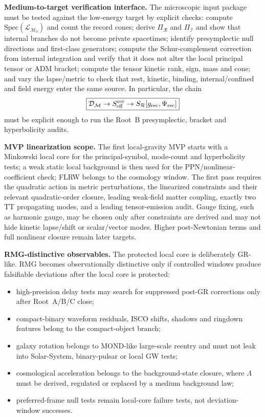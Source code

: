 \documentclass[11pt]{article}
\begin{document}
\medskip\noindent\textbf{Medium-to-target verification interface.}
The microscopic input package must be tested against the low-energy target by
explicit checks: compute \(\mathrm{Spec}(\mathcal L_{\mathcal M_0})\) and count
the record cones; derive \(\Pi_{\mathcal R}\) and \(\Pi_{\mathcal I}\) and
show that internal branches do not become private spacetimes; identify
presymplectic null directions and first-class generators; compute the
Schur-complement correction from internal integration and verify that it does
not alter the local principal tensor or ADM bracket; compute the tensor
kinetic rank, sign, mass and cone; and vary the lapse/metric to check that
rest, kinetic, binding, internal/confined and field energy enter the same
source.  In particular, the chain
\[
\boxed{
\mathcal D_{\mathcal M}\to S_{\rm eff}^{\rm rec}\to
S_{\mathcal R}[g_{\rm rec},\Psi_{\rm rec}]
}
\]
must be explicit enough to run the Root~B presymplectic, bracket and
hyperbolicity audits.

\medskip\noindent\textbf{MVP linearization scope.}
The first local-gravity MVP starts with a Minkowski local core for the
principal-symbol, mode-count and hyperbolicity tests; a weak static local
background is then used for the PPN/nonlinear-coefficient check; FLRW belongs
to the cosmology window.  The first pass requires the quadratic action in
metric perturbations, the linearized constraints and their relevant
quadratic-order closure, leading weak-field matter coupling, exactly two TT
propagating modes, and a leading tensor-emission audit.  Gauge fixing, such as
harmonic gauge, may be chosen only after constraints are derived and may not
hide kinetic lapse/shift or scalar/vector modes.  Higher post-Newtonian terms
and full nonlinear closure remain later targets.

\medskip\noindent\textbf{RMG-distinctive observables.}
The protected local core is deliberately GR-like.  RMG becomes observationally
distinctive only if controlled windows produce falsifiable deviations after
the local core is protected:
\begin{itemize}
\item high-precision delay tests may search for suppressed post-GR corrections
only after Root~A/B/C close;
\item compact-binary waveform residuals, ISCO shifts, shadows and ringdown
features belong to the compact-object branch;
\item galaxy rotation belongs to MOND-like large-scale reentry and must not
leak into Solar-System, binary-pulsar or local GW tests;
\item cosmological acceleration belongs to the background-state closure, where
\(\Lambda\) must be derived, regulated or replaced by a medium background law;
\item preferred-frame null tests remain local-core failure tests, not
deviation-window successes.
\end{itemize}
\end{document}
